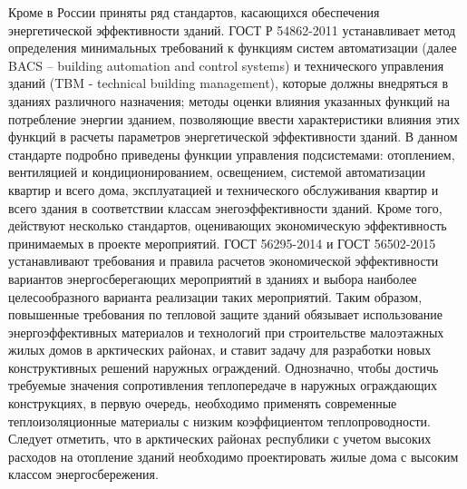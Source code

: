 Кроме в России приняты ряд стандартов, касающихся обеспечения энергетической эффективности зданий.
ГОСТ Р 54862-2011 \Code{[29]} устанавливает метод определения минимальных требований к функциям систем автоматизации
(далее BACS – building automation and control systems) и технического управления зданий (TBM - technical building management),
которые должны внедряться в зданиях различного назначения; методы оценки влияния указанных функций на потребление энергии зданием,
позволяющие ввести характеристики влияния этих функций в расчеты параметров энергетической эффективности зданий.
В данном стандарте подробно приведены функции управления подсистемами: отоплением, вентиляцией и кондиционированием, освещением, системой автоматизации квартир и всего дома, эксплуатацией и технического обслуживания квартир и всего здания в соответствии классам энегоэффективности зданий.
Кроме того, действуют несколько стандартов, оценивающих экономическую эффективность принимаемых в проекте мероприятий.
ГОСТ 56295-2014 \Code{[30]} и ГОСТ 56502-2015 \Code{[31]} устанавливают требования и правила расчетов экономической эффективности
вариантов энергосберегающих мероприятий в зданиях и выбора наиболее целесообразного варианта реализации таких мероприятий.
Таким образом, повышенные требования по тепловой защите зданий обязывает использование энергоэффективных материалов и технологий при строительстве малоэтажных жилых домов
в арктических районах, и ставит задачу для разработки новых конструктивных решений наружных ограждений.
Однозначно, чтобы достичь требуемые значения сопротивления теплопередаче в наружных ограждающих конструкциях, в первую очередь,
необходимо применять современные теплоизоляционные материалы с низким коэффициентом теплопроводности.
Следует отметить, что в арктических районах республики с учетом высоких расходов на отопление зданий необходимо проектировать жилые дома с высоким классом энергосбережения.



